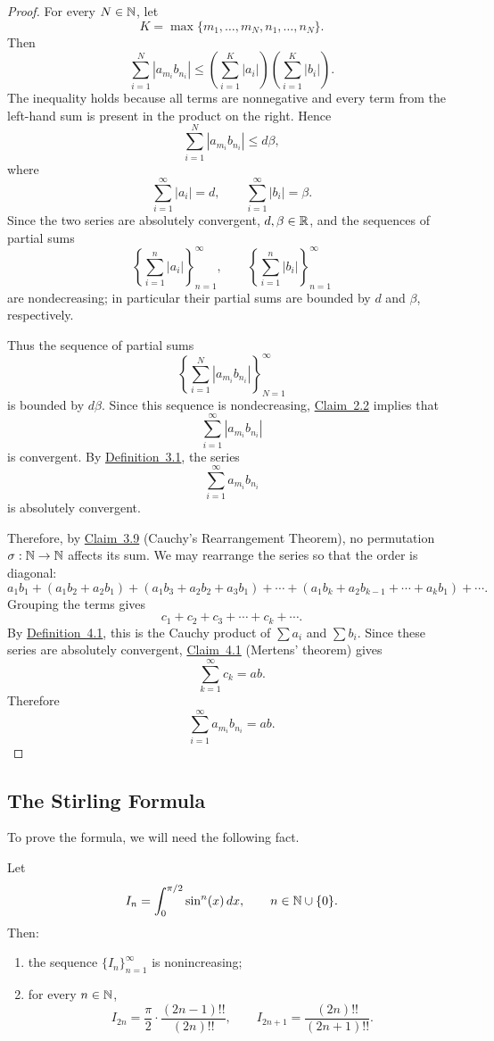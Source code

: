 \begin{proof}
For every $N\in\mathbb{N}$, let
\[
K=\max\{m_1,\ldots,m_N,n_1,\ldots,n_N\}.
\]
Then
\[
\sum_{i=1}^{N}|a_{m_i}b_{n_i}|
\le
\left(\sum_{i=1}^{K}|a_i|\right)
\left(\sum_{i=1}^{K}|b_i|\right).
\]
The inequality holds because all terms are nonnegative and every term from the left-hand sum is present in the product on the right. Hence
\[
\sum_{i=1}^{N}|a_{m_i}b_{n_i}|\le d\beta,
\]
where
\[
\sum_{i=1}^{\infty}|a_i|=d,
\qquad
\sum_{i=1}^{\infty}|b_i|=\beta.
\]
Since the two series are absolutely convergent, $d,\beta\in\mathbb{R}$, and the sequences of partial sums
\[
\left\{\sum_{i=1}^{n}|a_i|\right\}_{n=1}^{\infty},
\qquad
\left\{\sum_{i=1}^{n}|b_i|\right\}_{n=1}^{\infty}
\]
are nondecreasing; in particular their partial sums are bounded by $d$ and $\beta$, respectively.

Thus the sequence of partial sums
\[
\left\{\sum_{i=1}^{N}|a_{m_i}b_{n_i}|\right\}_{N=1}^{\infty}
\]
is bounded by $d\beta$. Since this sequence is nondecreasing, \hyperref[claim:2.2]{Claim~2.2} implies that
\[
\sum_{i=1}^{\infty}|a_{m_i}b_{n_i}|
\]
is convergent. By \hyperref[def:3.1]{Definition~3.1}, the series
\[
\sum_{i=1}^{\infty}a_{m_i}b_{n_i}
\]
is absolutely convergent.

Therefore, by \hyperref[claim:3.9]{Claim~3.9} (Cauchy's Rearrangement Theorem), no permutation $\sigma:\mathbb{N}\to\mathbb{N}$ affects its sum. We may rearrange the series so that the order is diagonal:
\[
a_1b_1
+(a_1b_2+a_2b_1)
+(a_1b_3+a_2b_2+a_3b_1)
+\cdots
+(a_1b_k+a_2b_{k-1}+\cdots+a_kb_1)+\cdots.
\]
Grouping the terms gives
\[
c_1+c_2+c_3+\cdots+c_k+\cdots.
\]
By \hyperref[def:4.1]{Definition~4.1}, this is the Cauchy product of $\sum a_i$ and $\sum b_i$. Since these series are absolutely convergent, \hyperref[claim:4.1]{Claim~4.1} (Mertens' theorem) gives
\[
\sum_{k=1}^{\infty}c_k=ab.
\]
Therefore
\[
\sum_{i=1}^{\infty}a_{m_i}b_{n_i}=ab.
\]
\end{proof}

\subsection*{The Stirling Formula}

To prove the formula, we will need the following fact.

\begin{claim}\label{claim:4.4}
Let
\[
I_n=\int_{0}^{\pi/2}\sin^n(x)\,dx,
\qquad n\in\mathbb{N}\cup\{0\}.
\]
Then:
\begin{enumerate}[label=\arabic*)]
\item\label{item:claim:4.4:1} the sequence $\{I_n\}_{n=1}^{\infty}$ is nonincreasing;
\item\label{item:claim:4.4:2} for every $n\in\mathbb{N}$,
\[
I_{2n}=\frac{\pi}{2}\cdot\frac{(2n-1)!!}{(2n)!!},
\qquad
I_{2n+1}=\frac{(2n)!!}{(2n+1)!!}.
\]
\end{enumerate}
\end{claim}


